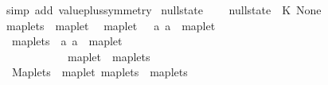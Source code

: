 \begin{isabellebody}
\isamarkupfalse%
\ {\isacharparenleft}simp\ add{\isacharcolon}\ value{\isacharunderscore}plus{\isacharunderscore}symmetry{\isacharparenright}%
\endisatagproof
{\isafoldproof}%
%
\isadelimproof
\isanewline
%
\endisadelimproof
\isanewline
{}\isamarkupfalse%
\ null{\isacharunderscore}state\ {\isacharparenleft}{\isachardoublequoteopen}{\isacharless}{\isachargreater}{\isachardoublequoteclose}{\isacharparenright}\ \isanewline
\ \ {\isachardoublequoteopen}null{\isacharunderscore}state\ {\isasymequiv}\ {\isacharparenleft}K{\isachardollar}\ None{\isacharparenright}{\isachardoublequoteclose}\isanewline
\isanewline
{}\isamarkupfalse%
\ maplets\ \ maplet\isanewline
\isanewline
{}\isamarkupfalse%
\isanewline
\ \ {\isachardoublequoteopen}{\isacharunderscore}maplet{\isachardoublequoteclose}\ \ {\isacharcolon}{\isacharcolon}\ {\isachardoublequoteopen}{\isacharbrackleft}{\isacharprime}a{\isacharcomma}\ {\isacharprime}a{\isacharbrackright}\ {\isasymRightarrow}\ maplet{\isachardoublequoteclose}\ \ \ \ \ \ \ \ \ \ \ \ \ {\isacharparenleft}{\isachardoublequoteopen}{\isacharunderscore}\ {\isacharslash}{\isacharcolon}{\isacharequal}{\isacharslash}\ {\isacharunderscore}{\isachardoublequoteclose}{\isacharparenright}\isanewline
\ \ {\isachardoublequoteopen}{\isacharunderscore}maplets{\isachardoublequoteclose}\ {\isacharcolon}{\isacharcolon}\ {\isachardoublequoteopen}{\isacharbrackleft}{\isacharprime}a{\isacharcomma}\ {\isacharprime}a{\isacharbrackright}\ {\isasymRightarrow}\ maplet{\isachardoublequoteclose}\ \ \ \ \ \ \ \ \ \ \ \ \ {\isacharparenleft}{\isachardoublequoteopen}{\isacharunderscore}\ {\isacharslash}{\isacharbrackleft}{\isacharcolon}{\isacharequal}{\isacharbrackright}{\isacharslash}\ {\isacharunderscore}{\isachardoublequoteclose}{\isacharparenright}\isanewline
\ \ {\isachardoublequoteopen}{\isachardoublequoteclose}\ \ \ \ \ \ \ \ \ {\isacharcolon}{\isacharcolon}\ {\isachardoublequoteopen}maplet\ {\isasymRightarrow}\ maplets{\isachardoublequoteclose}\ \ \ \ \ \ \ \ \ \ \ \ \ {\isacharparenleft}{\isachardoublequoteopen}{\isacharunderscore}{\isachardoublequoteclose}{\isacharparenright}\isanewline
\ \ {\isachardoublequoteopen}{\isacharunderscore}Maplets{\isachardoublequoteclose}\ {\isacharcolon}{\isacharcolon}\ {\isachardoublequoteopen}{\isacharbrackleft}maplet{\isacharcomma}\ maplets{\isacharbrackright}\ {\isasymRightarrow}\ maplets{\isachardoublequoteclose}\ {\isacharparenleft}{\isachardoublequoteopen}{\isacharunderscore}{\isacharcomma}{\isacharslash}\ {\isacharunderscore}{\isachardoublequoteclose}{\isacharparenright}\isanewline

\end{isabellebody}
